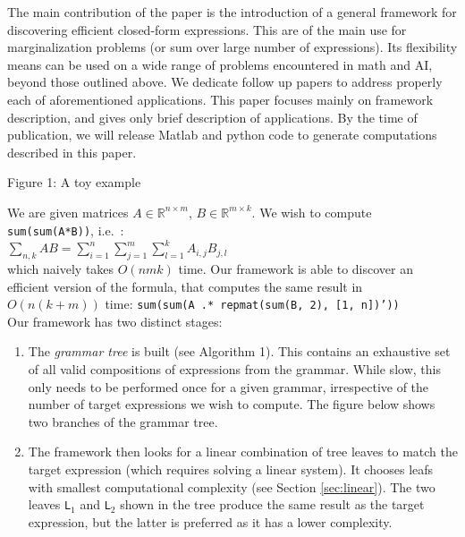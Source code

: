 The main contribution of the paper is the introduction of a general
framework for discovering efficient closed-form expressions. This are
of the main use for marginalization problems (or sum over large number of
expressions). Its
flexibility means can be used on a wide range of problems encountered
in math and AI, beyond those outlined above. We dedicate follow up 
papers to address properly each of aforementioned applications. This
paper focuses mainly on framework description, and gives only brief description
of applications. By the time of publication, we will release Matlab and python
code to generate computations described in this paper.


\begin{minipage}{\linewidth}
\begin{framed}
\begin{flushleft}
Figure 1: A toy example
\vspace{3mm}

We are given matrices $A \in \mathbb{R}^{n \times m}$, $B \in \mathbb{R}^{m \times k}$. We wish
 to compute \texttt{sum(sum(A*B))}, i.e.~: 
\vspace{1.5mm} \\ 
$\sum_{n,k} AB = \sum_{i = 1}^n \sum_{j = 1}^m \sum_{l = 1}^k A_{i, j} B_{j, l} $
\vspace{1.5mm} \\ 
which naively takes $O(nmk)$ time. Our framework is able to discover
an efficient version of the formula, that computes the same result in $O(n(k+m))$
time: \texttt{sum(sum(A .* repmat(sum(B, 2), [1, n])'))}
 \vspace{1mm} \\ 
Our framework has two  distinct stages:
 \vspace{-2mm} 
 \begin{enumerate}
\item The {\em grammar tree} is built (see Algorithm 1). This contains
  an exhaustive set of all valid compositions of expressions from the
  grammar. While slow, this only needs to be performed once for a
  given grammar, irrespective of the number of target expressions we
  wish to compute. The figure below shows two branches of the grammar
  tree.
\item The framework then looks for a linear combination of tree leaves 
  to match the target expression (which requires solving a linear system).
  It chooses leafs with smallest computational complexity 
  (see Section \ref{sec:linear}). The two leaves \texttt{L$_1$} and
  \texttt{L$_2$} shown in the tree produce the same result as the target
  expression, but the latter is preferred as it has a lower complexity. 
\end{enumerate}


\end{flushleft}
\end{framed}
\end{minipage}
